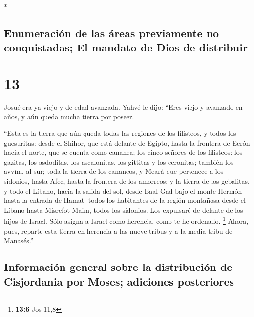 \begin{paracol}{2}
\begin{otherlanguage}{english}
\end{otherlanguage}

\switchcolumn[0]*

\hypertarget{enumeraciuxf3n-de-las-uxe1reas-previamente-no-conquistadas-el-mandato-de-dios-de-distribuir}{%
\subsection{Enumeración de las áreas previamente no conquistadas; El
mandato de Dios de
distribuir}\label{enumeraciuxf3n-de-las-uxe1reas-previamente-no-conquistadas-el-mandato-de-dios-de-distribuir}}

\hypertarget{section-24}{%
\section{13}\label{section-24}}

 Josué era ya viejo y de edad avanzada. Yahvé le dijo:
``Eres viejo y avanzado en años, y aún queda mucha tierra por poseer.

 ``Esta es la tierra que aún queda todas las regiones de
los filisteos, y todos los guesuritas;  desde el Shihor,
que está delante de Egipto, hasta la frontera de Ecrón hacia el norte,
que se cuenta como cananea; los cinco señores de los filisteos: los
gazitas, los asdoditas, los ascalonitas, los gittitas y los ecronitas;
también los avvim,  al sur; toda la tierra de los
cananeos, y Meará que pertenece a los sidonios, hasta Afec, hasta la
frontera de los amorreos;  y la tierra de los gebalitas, y
todo el Líbano, hacia la salida del sol, desde Baal Gad bajo el monte
Hermón hasta la entrada de Hamat;  todos los habitantes de
la región montañosa desde el Líbano hasta Misrefot Maim, todos los
sidonios. Los expulsaré de delante de los hijos de Israel. Sólo asigna a
Israel como herencia, como te he ordenado. \footnote{\textbf{13:6} Jos
  11,8}  Ahora, pues, reparte esta tierra en herencia a
las nueve tribus y a la media tribu de Manasés.''

\hypertarget{informaciuxf3n-general-sobre-la-distribuciuxf3n-de-cisjordania-por-moses-adiciones-posteriores}{%
\subsection{Información general sobre la distribución de Cisjordania por
Moses; adiciones
posteriores}\label{informaciuxf3n-general-sobre-la-distribuciuxf3n-de-cisjordania-por-moses-adiciones-posteriores}}


\end{paracol}
